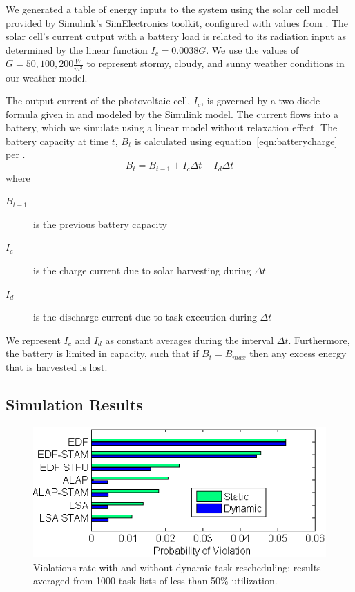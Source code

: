 We generated a table of energy inputs to the system using the solar cell model provided by 
Simulink's SimElectronics toolkit, configured with values from \cite{gonzalez2006model}.  
The solar cell's current output with a battery load is related to its radiation input as 
determined by the linear function $I_c = 0.0038G$.  
We use the values of $G = 50, 100, 200 \frac{W}{m^2}$ to represent stormy, cloudy, and sunny weather conditions 
in our weather model.

The output current of the photovoltaic cell, $I_c$, is governed by a two-diode formula given in \cite{marwali1997probabilistic} and modeled by the Simulink model.  
The current flows into a battery, which we simulate using a linear model without relaxation effect.  
The battery capacity at time $t$, $B_t$ is calculated using equation~\ref{eqn:batterycharge} per \cite{niyato2007sleep}.
\begin{equation}
 B_t = B_{t-1} + I_c \Delta t - I_d \Delta t
\label{eqn:batterycharge}
\end{equation}
where 
\begin{description}
\item[$B_{t-1}$] is the previous battery capacity
\item[$I_c$] is the charge current due to solar harvesting during $\Delta t$
\item[$I_d$] is the discharge current due to task execution during $\Delta t$
\end{description}
We represent $I_c$ and $I_d$  as constant averages during the interval $\Delta t$. Furthermore, the battery is
limited in capacity, such that if $B_t = B_{max}$ then any excess energy that is harvested is lost.

\subsection{Simulation Results}

\begin{figure}[tb]
\begin{center}
\includegraphics[scale=0.65]{bar.png}
\end{center}
\caption{Violations rate with and without dynamic task rescheduling; 
results averaged from 1000 task lists of less than 50\% utilization.  \label{fig:simresults}}
\end{figure}

